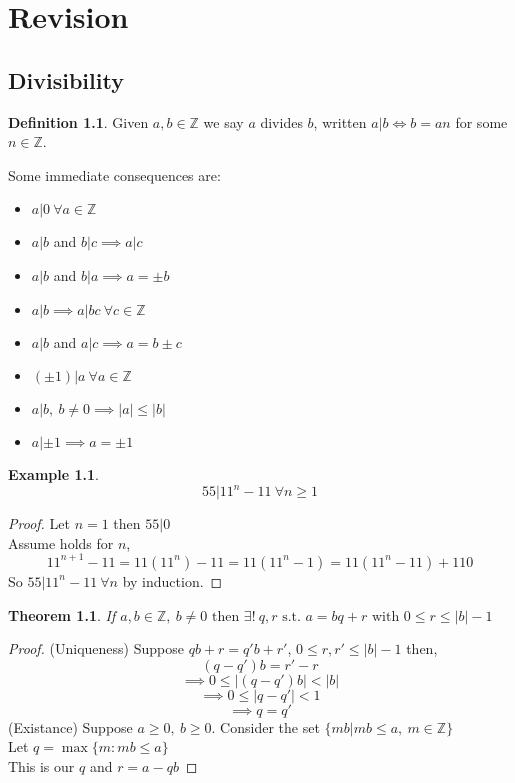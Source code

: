 \documentclass{book}
\newtheorem*{thm}{Theorem}
\theoremstyle{definition}
\newtheorem*{defn}{Definition}
\newtheorem*{ex}{Example}
\newcommand{\ZZ}{\mathbb{Z}}
\begin{document}
\maketitle

\chapter{Revision}
\section{Divisibility}
\begin{defn}
Given $a,b \in \ZZ$ we say $a$ divides $b$, written $a|b \iff b=an$ for some $n \in \ZZ$. 
\end{defn}
Some immediate consequences are:
\begin{itemize}
\item $a|0\ \forall a \in \ZZ$
\item $a|b$ and $b|c \implies a|c$
\item $a|b$ and $b|a \implies a = \pm b$
\item $a|b \implies a|bc\ \forall c \in \ZZ$
\item $a|b$ and $a|c \implies a = b \pm c$
\item $(\pm 1)|a\  \forall a \in \ZZ$
\item $a|b,\ b\neq 0 \implies |a| \leq |b|$
\item $a|\pm1 \implies a = \pm 1$
\end{itemize}
\begin{ex}
$$55| 11^n - 11\ \forall n \geq 1$$
\end{ex}
\begin{proof}
Let $n=1$ then $55|0$ \\
Assume holds for $n$,
    $$11^{n+1}-11=11(11^n)-11=11(11^n-1) = 11(11^n-11)+110$$
So $55|11^n-11\ \forall n$ by induction.
\end{proof}
\begin{thm}
If $a,b \in \ZZ,\ b\neq 0\text{ then }\exists!\ q,r \text{ s.t. } a = bq +r\text{ with }0\leq r \leq |b|-1$
\end{thm}
\begin{proof}(Uniqueness)
Suppose $qb+r=q'b+r'$, $0\leq r,r' \leq|b|-1$ then,
	$$(q-q')b=r'-r$$
	$$\implies 0 \leq |(q-q')b|<|b|$$
	$$\implies 0 \leq |q-q'| < 1$$
	$$\implies q=q'$$
(Existance) Suppose $a \geq 0,\ b\geq 0$. Consider the set $\{mb|mb \leq a,\ m\in\ZZ\}$\\
	Let $q=\max\{m:mb\leq a\}$ \\
	This is our $q$ and $r = a-qb$
\end{proof}
\end{document}
